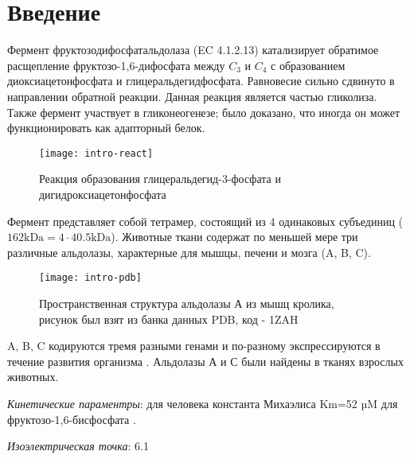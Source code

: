 \section{Введение}
Фермент фруктозодифосфатальдолаза (EC 4.1.2.13) катализирует обратимое расщепление
фруктозо-1,6-дифосфата между $C_3$ и $C_4$ с образованием диоксиацетонфосфата и глицеральдегидфосфата.
Равновесие сильно сдвинуто в направлении обратной реакции.
Данная реакция является частью гликолиза. Также фермент участвует в гликонеогенезе;
было доказано, что иногда он может функционировать как адапторный белок.

\begin{figure}[htbp]
\texttt{[image: intro-react]}
\caption[Реакция, проводимая фруктозодифосфатальдолазой]
    {Реакция образования глицеральдегид-3-фосфата и дигидроксиацетонфосфата}
\label{fig-intro-react}
\end{figure}

\label{lit-m}
Фермент представляет собой тетрамер, состоящий из 4 одинаковых субъединиц
($ 162 \text{kDa} = 4 \cdot 40.5 \text{kDa} $).
Животные ткани содержат по меньшей мере три различные альдолазы, характерные для
мышцы, печени и мозга (A, B, C).

\begin{figure}[htbp]
\texttt{[image: intro-pdb]}
\caption[Пространственная структура альдолазы А из мышц кролика]
    {Пространственная структура альдолазы А из мышц кролика,
    рисунок был взят из банка данных PDB, код - 1ZAH}
\label{fig-intro-pdb}
\end{figure}

A, B, C кодируются тремя разными генами и по-разному экспрессируются в течение развития организма
\cite{ABC} \cite{ABC-1}.
Альдолазы А и С были найдены в тканях взрослых животных.

\emph{Кинетические параментры}: для человека константа Михаэлиса Km=52 µM для фруктозо-1,6-бисфосфата
\cite{uniprot-human}.

\emph{Изоэлектрическая точка}: 6.1 \cite{pI}

